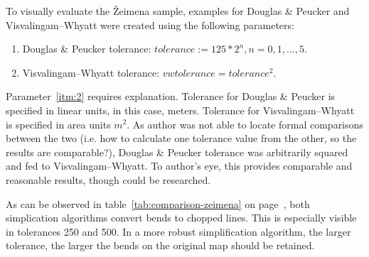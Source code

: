 \documentclass[a4paper]{article}
\newcommand{\DP}{Douglas \& Peucker}
\newcommand{\VW}{Visvalingam--Whyatt}
\begin{document}
To visually evaluate the Žeimena sample, examples for {\DP} and {\VW}
were created using the following parameters:

\begin{enumerate}[label=(\Roman*)]
    \item {\DP} tolerance: $tolerance := 125 * 2^n, n = 0,1,...,5$.
    \item {\VW} tolerance: $vwtolerance = tolerance ^ 2$\label{itm:2}.
\end{enumerate}

Parameter~\ref{itm:2} requires explanation. Tolerance for {\DP} is specified in
linear units, in this case, meters. Tolerance for {\VW} is specified in area
units $m^2$. As author was not able to locate formal comparisons between the
two (i.e. how to calculate one tolerance value from the other, so the results
are comparable?), {\DP} tolerance was arbitrarily squared and fed to {\VW}. To
author's eye, this provides comparable and reasonable results, though could be
researched.

As can be observed in table~\ref{tab:comparison-zeimena} on
page~\pageref{tab:comparison-zeimena}, both simplication algorithms convert
bends to chopped lines. This is especially visible in tolerances 250 and 500.
In a more robust simplification algorithm, the larger tolerance, the larger the
bends on the original map should be retained.
\end{document}
